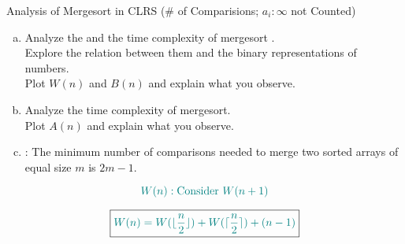 
\begin{frame}{}

  \begin{columns}
  \end{columns}
\end{frame}

\begin{frame}{}
  \begin{exampleblock}{Analysis of Mergesort in CLRS (\# of Comparisions; $a_i : \infty$ not Counted)}
    \begin{enumerate}[(a)]
      \setlength{\itemsep}{5pt}
      \item Analyze the  and the  
	time complexity of mergesort . \\
	Explore the relation between them and the binary representations of numbers. \\
	Plot $W(n)$ and $B(n)$ and explain what you observe.
      \item Analyze the  time complexity of mergesort. \\
	Plot $A(n)$ and explain what you observe.
      \item {}: 
	The minimum number of comparisons needed to merge two sorted arrays of equal size $m$ is $2m - 1$.
    \end{enumerate}
  \end{exampleblock}

  \pause
  \[
    \textcolor{teal}{W(n): \text{Consider } W(n+1)}
  \]
\end{frame}

\begin{frame}{}
  \[
    \boxed{\textcolor{teal}{W(n) = W(\lfloor \frac{n}{2} \rfloor) + W(\lceil \frac{n}{2} \rceil) + (n-1)}}
  \]
\end{frame}
